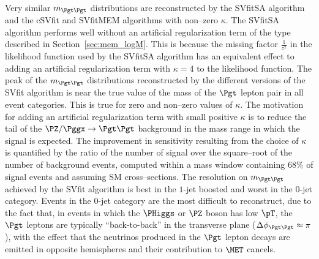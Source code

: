 Very similar $m_{\Pgt\Pgt}$ distributions are reconstructed by the SVfitSA algorithm and the cSVfit and SVfitMEM algorithms with non--zero $\kappa$.
The SVfitSA algorithm performs well without an artificial regularization term of the type described in Section~\ref{sec:mem_logM}.
This is because the missing factor $\frac{1}{z^{2}}$ in the likelihood function used by the SVfitSA algorithm
has an equivalent effect to adding an artificial regularization term with $\kappa = 4$ to the likelihood function.
The peak of the $m_{\Pgt\Pgt}$ distributions reconstructed by the different versions of the SVfit algorithm is near the true value of the mass of the $\Pgt$ lepton pair
in all event categories.
This is true for zero and non--zero values of $\kappa$.
The motivation for adding an artificial regularization term with small positive $\kappa$ is to reduce the tail of the $\PZ/\Pggx \to \Pgt\Pgt$ background
in the mass range in which the signal is expected.
The improvement in sensitivity resulting from the choice of $\kappa$ is quantified by the ratio of the number of signal over the square--root of the number of background events,
computed within a mass window containing $68\%$ of signal events and assuming SM cross--sections.
The resolution on $m_{\Pgt\Pgt}$ achieved by the SVfit algorithm is best in the $1$-jet boosted and worst in the $0$-jet category.
Events in the $0$-jet category are the most difficult to reconstruct,
due to the fact that, in events in which the $\PHiggs$ or $\PZ$ boson has low $\pT$, 
the $\Pgt$ leptons are typically ``back-to-back'' in the transverse plane ($\Delta\phi_{\Pgt\Pgt} \approx \pi$),
with the effect that the neutrinos produced in the $\Pgt$ lepton decays are emitted in opposite hemispheres and their contribution to $\MET$ cancels.
